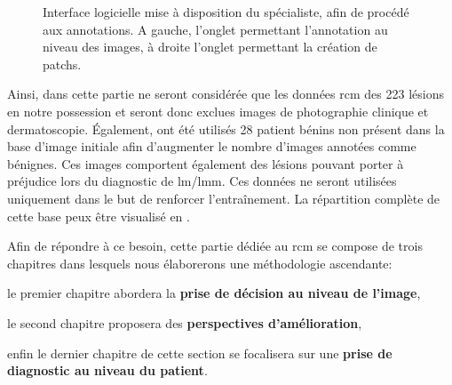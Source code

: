 \begin{figure}[H]
\begin{subfigure}{.45\textwidth}
    \end{subfigure}
    \caption{Interface logicielle mise à disposition du spécialiste, afin de procédé aux annotations. A gauche, l'onglet permettant l'annotation au niveau des images, à droite l'onglet permettant la création de patchs.}
    \label{fig:example_gui_annotation}
\end{figure}

Ainsi, dans cette partie ne seront considérée que les données \gls{rcm} des 223 lésions en notre possession et seront donc exclues images de photographie clinique et dermatoscopie. Également, ont été utilisés 28 patient bénins non présent dans la base d'image initiale afin d'augmenter le nombre d'images annotées comme bénignes. Ces images comportent également des lésions pouvant porter à préjudice lors du diagnostic de \gls{lm}/\gls{lmm}. Ces données ne seront utilisées uniquement dans le but de renforcer l'entraînement. La répartition complète de cette base peux être visualisé en .\par


Afin de répondre à ce besoin, cette partie dédiée au \gls{rcm} se compose de trois chapitres dans lesquels nous élaborerons une méthodologie ascendante:
\begin{inlinerate}
\item le premier chapitre abordera la \textbf{prise de décision au niveau de l'image},
\item le second chapitre proposera des \textbf{perspectives d'amélioration},
\item enfin le dernier chapitre de cette section se focalisera sur une \textbf{prise de diagnostic au niveau du patient}.
\end{inlinerate}\par
\newpage